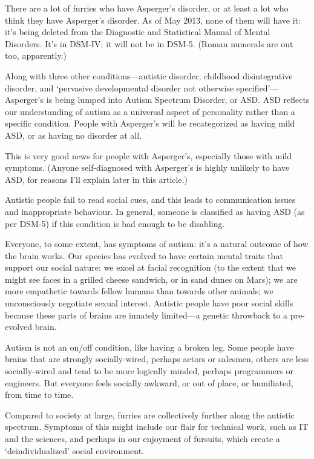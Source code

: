 
There are a lot of furries who have Asperger's disorder, or at least a lot who think they have Asperger's disorder. As of May 2013, none of them will have it: it's being deleted from the Diagnostic and Statistical Manual of Mental Disorders. It's in DSM-IV; it will not be in DSM-5. (Roman numerals are out too, apparently.)

Along with three other conditions—autistic disorder, childhood disintegrative disorder, and `pervasive developmental disorder not otherwise specified'—Asperger's is being lumped into Autism Spectrum Disorder, or ASD. ASD reflects our understanding of autism as a universal aspect of personality rather than a specific condition. People with Asperger's will be recategorized as having mild ASD, or as having no disorder at all.

This is very good news for people with Asperger's, especially those with mild symptoms. (Anyone self-diagnosed with Asperger's is highly unlikely to have ASD, for reasons I'll explain later in this article.)

Autistic people fail to read social cues, and this leads to communication issues and inappropriate behaviour. In general, someone is classified as having ASD (as per DSM-5) if this condition is bad enough to be disabling.

Everyone, to some extent, has symptoms of autism: it's a natural outcome of how the brain works. Our species has evolved to have certain mental traits that support our social nature: we excel at facial recognition (to the extent that we might see faces in a grilled cheese sandwich, or in sand dunes on Mars); we are more empathetic towards fellow humans than towards other animals; we unconsciously negotiate sexual interest. Autistic people have poor social skills because these parts of brains are innately limited—a genetic throwback to a pre-evolved brain.

Autism is not an on/off condition, like having a broken leg. Some people have brains that are strongly socially-wired, perhaps actors or salesmen, others are less socially-wired and tend to be more logically minded, perhaps programmers or engineers. But everyone feels socially awkward, or out of place, or humiliated, from time to time.

Compared to society at large, furries are collectively further along the autistic spectrum. Symptoms of this might include our flair for technical work, such as IT and the sciences, and perhaps in our enjoyment of fursuits, which create a `deindividualized' social environment.

